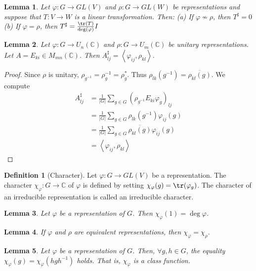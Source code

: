 \documentclass{article}
\newtheorem{Lem}{Lemma}[section]
\theoremstyle{definition}
\newtheorem{Def}{Definition}[section]
\begin{document}
\begin{Lem}
    Let $\varphi:G\to GL(V)$ and $\rho:G\to GL(W)$ be representations and suppose that $T:V\to W$ is a linear transformation. Then:
    \newline (a) If $\varphi\nsim\rho$, then $T^\sharp=0$\newline 
    (b) If $\varphi=\rho$, then $T^\sharp=\frac{\tr(T)}{\deg (\varphi)}I$
\end{Lem}

\begin{Lem}
    Let $\varphi:G\to U_n(\mathbb{C})$ and $\rho:G\to U_m(\mathbb{C})$ be unitary representations. Let $A=E_{ki}\in M_{mn}(\mathbb{C})$. Then $A^\sharp_{lj}=\left\langle\varphi_{ij},\rho_{kl}\right\rangle$.
\end{Lem}
\begin{proof}
    Since $\rho$ is unitary, $\rho_{g^{-1}}=\rho_g^{-1}=\rho_g^*$. Thus $\rho_{lk}(g^{-1})=\overline{\rho_{kl}(g)}$.
    We compute \begin{align*}
        A^\sharp_{lj}&=\frac{1}{\left|G\right|}\sum_{g\in G}(\rho_{g^{-1}}E_{ki}\varphi_g)_{lj}\\
        &=\frac{1}{\left|G\right|}\sum_{g\in G}\rho_{lk}(g^{-1})\varphi_{ij}(g)\\
        &=\frac{1}{\left|G\right|}\sum_{g\in G}\overline{\rho_{kl}(g)}\varphi_{ij}(g)\\
        &=\left\langle\varphi_{ij},\rho_{kl}\right\rangle
    \end{align*}
\end{proof}


\begin{Def}[Character]
    Let $\varphi:G\to GL(V)$ be a representation. The character $\chi_\varphi:G\to\mathbb{C}$ of $\varphi$ is defined by setting $\chi_\varphi(g)=\tr(\varphi_g)$.
    The character of an irreducible representation is called an irreducible character.
\end{Def}

\begin{Lem}
    Let $\varphi$ be a representation of $G$. Then $\chi_\varphi(1)=\deg \varphi$.
\end{Lem}
\begin{Lem}
    If $\varphi$ and $\rho$ are equivalent representations, then $\chi_\varphi=\chi_\rho$.
\end{Lem}
\begin{Lem}
    Let $\varphi$ be a representation of $G$. Then, $\forall g,h\in G$, the equality $\chi_\varphi(g)=\chi_\varphi(hgh^{-1})$ holds. That is, $\chi_\varphi$ is a class function.
\end{Lem}
\end{document}
